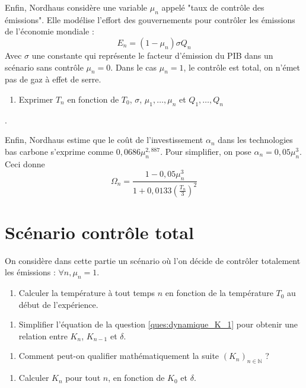 \documentclass[12pt]{article}
\newcommand{\ques}[1]{\begin{enumerate}[resume]
\item  #1
\end{enumerate}}
\newcommand{\rep}[1]{\textit{Réponse :} #1 \\}
\renewcommand{\rep}[1]{ }
\theoremstyle{remark}
\def\NN{\mathbb{N}}
\begin{document}
Enfin, Nordhaus considère une variable $\mu_n$ appelé "taux de contrôle des émissions".
Elle modélise l'effort des gouvernements pour contrôler les émissions de l'économie mondiale :
\begin{equation*}
E_n=(1-\mu_n)\sigma Q_n
\end{equation*}
Avec $\sigma$ une constante qui représente le facteur d'émission du PIB dans un scénario sans contrôle $\mu_n=0$. 
Dans le cas $\mu_n=1$, le contrôle est total, on n'émet pas de gaz à effet de serre.
\ques{Exprimer $T_n$ en fonction de $T_0$, $\sigma$, $\mu_1, \dots, \mu_n$ et $Q_1, \dots ,Q_n$}.
\rep{\begin{equation*}T_n= T_0+\frac{\sigma}{2000} \sum_{k=1}^n (1-\mu_k) Q_k  \end{equation*}}

Enfin, Nordhaus estime que le coût de l'investissement $\alpha_n$ dans les technologies bas carbone s'exprime comme $0,0686 \mu_n^{2,887}$. Pour simplifier, on pose $\alpha_n = 0,05\mu_n^3$. Ceci donne 
\begin{equation*}
\Omega_n = \frac{1-0,05\mu_n^3}{1+0,0133 (\frac{T_n}{3})^2}
\end{equation*}

\section{Scénario contrôle total}
On considère dans cette partie un scénario où l'on décide de contrôler totalement les émissions : $\forall n, \mu_n=1$.
\ques{Calculer la température à tout temps $n$ en fonction de la température $T_0$ au début de l'expérience. }
\rep{$\forall n, T_n =T_0 = 0,8$°C.}

\ques{Simplifier l'équation de la question \ref{ques:dynamique_K_1} pour obtenir une relation entre $K_n$, $K_{n-1}$ et $\delta$.\label{ques:dynamique_K_2} }
\rep{
\begin{equation*}
\forall n, \quad \Omega_n = \frac{1-0,05}{1+0,0133 (\frac{T_0}{3})}^2=\frac{0,95}{1,000945778}=0,9491
\end{equation*}
\begin{equation*}
\forall n, \quad  K_n = \frac{1- \delta}{1- 0,2373 A} K_{n-1}
\end{equation*}
}

\ques{Comment peut-on qualifier mathématiquement la suite $(K_n)_{n\in \NN}$ ? \label{ques:suite_geo}}
\rep{$(K_n)_{n\in \NN}$ est une suite géométrique de raison $\frac{1- \delta}{1- 0,2373}$.}

\ques{Calculer $K_n$ pour tout $n$, en fonction de $K_0$ et $\delta$.}
\rep{\begin{equation*}
\forall n, \quad  K_n = K_0 \left(\frac{1- \delta}{1- 0,2373}\right)^n 
\end{equation*}}
\end{document}
